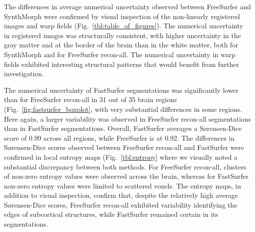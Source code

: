 
The differences in average numerical uncertainty observed between FreeSurfer and SynthMorph were confirmed by visual inspection of the non-linearly registered images and warp fields (Fig.~\ref{tbl:table_of_figures}).
The numerical uncertainty in registered images was structurally consistent, with higher uncertainty in the gray matter and at the border of the brain than in the white matter, both for SynthMorph and for FreeSurfer recon-all. The numerical uncertainty in warp fields exhibited interesting structural patterns that would benefit from further investigation. 

The numerical uncertainty of FastSurfer segmentations was significantly lower than for FreeSurfer recon-all in 31 out of 35 brain regions (Fig.~\ref{fig:fastsurfer_boxplot},
with very substantial differences in some regions.
Here again, a larger variability was observed in FreeSurfer recon-all segmentations than in FastSurfer segmentations.
Overall, FastSurfer averages a Sørensen-Dice score of 0.99 across all regions, while FreeSurfer is at 0.92.
The differences in Sørensen-Dice scores observed between FreeSurfer recon-all and FastSurfer were confirmed in local entropy maps (Fig.~\ref{tbl:entropy} where we visually noted a substantial discrepancy between both methods.
For FreeSurfer recon-all, clusters of non-zero entropy values were observed across the brain, whereas for FastSurfer non-zero entropy values were limited to scattered voxels. 
The entropy maps, in addition to visual inspection, confirm that, despite the relatively high average Sørensen-Dice scores,  FreeSurfer recon-all exhibited variability identifying the edges of subcortical structures, while FastSurfer remained certain in its segmentations.


